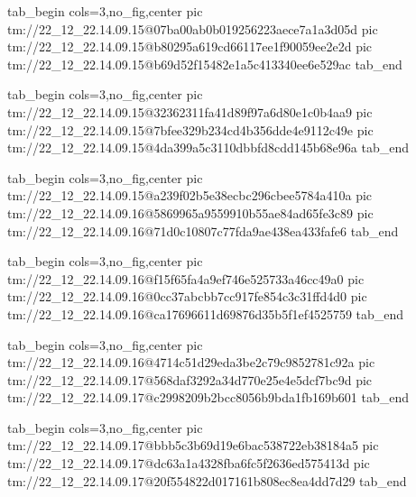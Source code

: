  
 
 
 
 

\qqSecCmtScr


\ifcmt
  tab_begin cols=3,no_fig,center
    pic tm://22_12_22.14.09.15@07ba00ab0b019256223aece7a1a3d05d
    pic tm://22_12_22.14.09.15@b80295a619cd66117ee1f90059ee2e2d
    pic tm://22_12_22.14.09.15@b69d52f15482e1a5c413340ee6e529ac
  tab_end
\fi


\ifcmt
  tab_begin cols=3,no_fig,center
    pic tm://22_12_22.14.09.15@32362311fa41d89f97a6d80e1c0b4aa9
    pic tm://22_12_22.14.09.15@7bfee329b234cd4b356dde4e9112c49e
    pic tm://22_12_22.14.09.15@4da399a5c3110dbbfd8cdd145b68e96a
  tab_end
\fi


\ifcmt
  tab_begin cols=3,no_fig,center
    pic tm://22_12_22.14.09.15@a239f02b5e38ecbc296cbee5784a410a
    pic tm://22_12_22.14.09.16@5869965a9559910b55ae84ad65fe3c89
    pic tm://22_12_22.14.09.16@71d0c10807c77fda9ae438ea433fafe6
  tab_end
\fi


\ifcmt
  tab_begin cols=3,no_fig,center
    pic tm://22_12_22.14.09.16@f15f65fa4a9ef746e525733a46cc49a0
    pic tm://22_12_22.14.09.16@0cc37abcbb7cc917fe854c3c31ffd4d0
    pic tm://22_12_22.14.09.16@ca17696611d69876d35b5f1ef4525759
  tab_end
\fi


\ifcmt
  tab_begin cols=3,no_fig,center
    pic tm://22_12_22.14.09.16@4714c51d29eda3be2c79c9852781c92a
    pic tm://22_12_22.14.09.17@568daf3292a34d770e25e4e5dcf7bc9d
    pic tm://22_12_22.14.09.17@c2998209b2bcc8056b9bda1fb169b601
  tab_end
\fi


\ifcmt
  tab_begin cols=3,no_fig,center
    pic tm://22_12_22.14.09.17@bbb5c3b69d19e6bac538722eb38184a5
    pic tm://22_12_22.14.09.17@dc63a1a4328fba6fc5f2636ed575413d
    pic tm://22_12_22.14.09.17@20f554822d017161b808ec8ea4dd7d29
  tab_end
\fi

